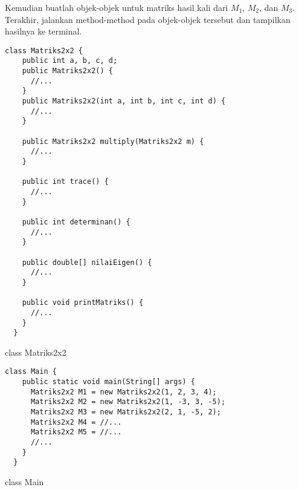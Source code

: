 \documentclass{article}
\begin{document}
  \noindent Kemudian buatlah objek-objek untuk matriks hasil kali dari $M_{1}$, $M_{2}$, dan $M_{3}$. Terakhir, jalankan method-method pada objek-objek tersebut dan tampilkan hasilnya ke terminal.
  \begin{listing}[htbp]
  \begin{verbatim}
class Matriks2x2 {
    public int a, b, c, d;
    public Matriks2x2() {
      //...
    }
    public Matriks2x2(int a, int b, int c, int d) {
      //...
    }
    
    public Matriks2x2 multiply(Matriks2x2 m) {
      //...
    }
    
    public int trace() {
      //...
    }
    
    public int determinan() {
      //...
    }
    
    public double[] nilaiEigen() {
      //...
    }

    public void printMatriks() {
      //...
    }
  }
  \end{verbatim}
  \caption{class Matriks2x2}
\end{listing}
  \begin{listing}[htbp]
  \begin{verbatim}
class Main {
    public static void main(String[] args) {
      Matriks2x2 M1 = new Matriks2x2(1, 2, 3, 4);
      Matriks2x2 M2 = new Matriks2x2(1, -3, 3, -5);
      Matriks2x2 M3 = new Matriks2x2(2, 1, -5, 2);
      Matriks2x2 M4 = //...
      Matriks2x2 M5 = //...
      //...
    }
  }
  \end{verbatim}
  \caption{class Main}
\end{listing}
\end{document}
